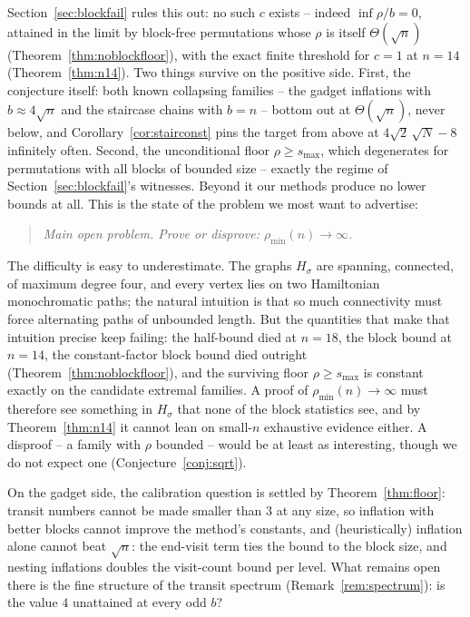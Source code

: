 \documentclass[11pt]{article}
\theoremstyle{definition}
\newcommand{\pmin}{\rho_{\min}}
\newcommand{\smax}{s_{\max}}
\begin{document}
Section~\ref{sec:blockfail} rules this out: no such $c$ exists --
indeed $\inf \rho/b = 0$, attained in the limit by block-free permutations whose
$\rho$ is itself $\Theta(\sqrt n)$ (Theorem~\ref{thm:noblockfloor}), with the exact
finite threshold for $c = 1$ at $n = 14$ (Theorem~\ref{thm:n14}). Two things survive
on the positive side. First, the conjecture itself: both known collapsing families --
the gadget inflations with $b \approx 4\sqrt n$ and the staircase chains with $b = n$
-- bottom out at $\Theta(\sqrt n)$, never below, and
Corollary~\ref{cor:stairconst} pins the target from above at
$4\sqrt2\,\sqrt N - 8$ infinitely often. Second, the unconditional floor
$\rho \ge \smax$, which degenerates for permutations with all blocks of bounded size
-- exactly the regime of Section~\ref{sec:blockfail}'s witnesses. Beyond it our
methods produce no lower bounds at all. This is the state of the problem we most want
to advertise:

\begin{quote}
\emph{Main open problem. Prove or disprove: $\pmin(n) \to \infty$.}
\end{quote}

The difficulty is easy to underestimate. The graphs $H_\sigma$ are spanning,
connected, of maximum degree four, and every vertex lies on two Hamiltonian
monochromatic paths; the natural intuition is that so much connectivity must force
alternating paths of unbounded length. But the quantities that make that intuition
precise keep failing: the half-bound died at $n = 18$, the block bound at $n = 14$,
the constant-factor block bound died outright
(Theorem~\ref{thm:noblockfloor}), and the surviving floor $\rho \ge \smax$ is
constant exactly on the candidate extremal families. A proof of
$\pmin(n) \to \infty$ must therefore see something in $H_\sigma$ that none of the
block statistics see, and by Theorem~\ref{thm:n14} it cannot lean on small-$n$
exhaustive evidence either. A disproof -- a family with $\rho$ bounded -- would be at
least as interesting, though we do not expect one (Conjecture~\ref{conj:sqrt}).

On the gadget side, the calibration question is settled by
Theorem~\ref{thm:floor}: transit numbers cannot be made smaller than $3$ at any size,
so inflation with better blocks cannot improve the method's constants, and
(heuristically) inflation alone cannot beat $\sqrt n$: the end-visit term ties the
bound to the block size, and nesting inflations doubles the visit-count bound per
level. What remains open there is the fine structure of the transit spectrum
(Remark~\ref{rem:spectrum}): is the value $4$ unattained at every odd $b$?
\end{document}
